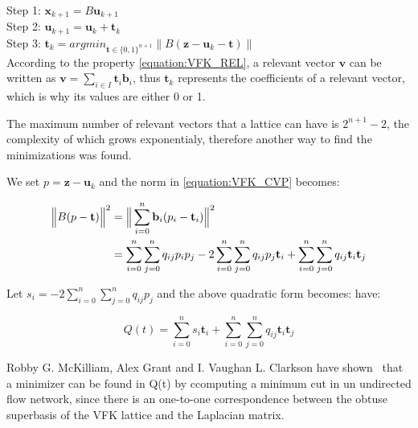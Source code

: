 \documentclass{amsart}
\numberwithin{equation}{section}
\begin{document}
{Step 1: $ \textbf{x}_{k+1} = B\textbf{u}_{k+1}$ \\

Step 2: $ \textbf{u}_{k+1} = \textbf{u}_k + \textbf{t}_k$ \\

Step 3: $ \textbf{t}_k = argmin_{\textbf{t} \in \{0,1\}^{n+1}} \| B(\textbf{z}-\textbf{u}_k-\textbf{t}) \| $ \\

According to the property \eqref{equation:VFK_REL}, a relevant vector $\textbf{v}$ can be written as $\textbf{v} = \sum_{i \in I}\textbf{t}_i\textbf{b}_i$, thus $\textbf{t}_k$ represents the coefficients of a relevant vector, which is why its values are either 0 or 1.

The maximum number of relevant vectors that a lattice can have is $2^{n+1}-2$, the complexity of which grows exponentialy, therefore another way to find the minimizations was found.


We set $p=\textbf{z}-\textbf{u}_k$ and the norm in \eqref{equation:VFK_CVP} becomes:

\begin{equation}
\begin{split}
\Big{\|} B(p-\textbf{t}) \Big{\|}^2 & =  \Big{\|} \sum_{i=0}^{n}{\textbf{b}_i(p_i-\textbf{t}_i)} \Big{\|}^2 \\ & = \sum_{i=0}^{n}\sum_{j=0}^{n}q_{ij}p_ip_j - 2\sum_{i=0}^{n}\sum_{j=0}^{n}q_{ij}p_j \textbf{t}_i + \sum_{i=0}^{n}\sum_{j=0}^{n}q_{ij}\textbf{t}_i\textbf{t}_j
\end{split}
\label{equation:VFK_CVP_MIN}
\end{equation}

Let $s_i = - 2\sum_{i=0}^{n}\sum_{j=0}^{n}q_{ij}p_j$ and the above quadratic form becomes: have:

\begin{equation}
Q(t) = \sum_{i=0}^{n}s_i \textbf{t}_i + \sum_{i=0}^{n}\sum_{j=0}^{n}q_{ij}\textbf{t}_i\textbf{t}_j
\label{equation:VFK_QT}
\end{equation}

Robby G. McKilliam, Alex Grant and I. Vaughan L. Clarkson have shown~\cite{VFK-CVP} that a minimizer can be found in Q(t) by ccomputing a minimum cut in un undirected flow network, since there is an one-to-one correspondence between the obtuse superbasis of the VFK lattice and the Laplacian matrix. 

}
\end{document}
